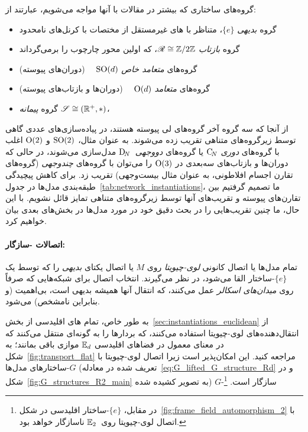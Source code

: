گروه‌های ساختاری که بیشتر در مقالات با آنها مواجه می‌شویم، عبارتند از:
\begin{itemize}
	\item[{\rule[2.0pt]{2pt}{2pt}}]
	گروه \emph{بدیهی} $\{e\}$، متناظر با \CNN های غیرمستقل از مختصات با کرنل‌های نامحدود
	\item[{\rule[2.0pt]{2pt}{2pt}}]
	گروه \emph{بازتاب} $\mathscr{R} \cong \mathbb{Z}/2\mathbb{Z}$، که اولین محور چارچوب را برمی‌گرداند
	\item[{\rule[2.0pt]{2pt}{2pt}}]
	گروه‌های \emph{متعامد خاص} $\operatorname{SO}(d)$
	\ \ (دوران‌های پیوسته)
	\item[{\rule[2.0pt]{2pt}{2pt}}]
	گروه‌های \emph{متعامد} $\operatorname{O}(d)$
	\ \ (دوران‌ها و بازتاب‌های پیوسته)
	\item[{\rule[2.0pt]{2pt}{2pt}}]
	گروه \emph{پیمانه} $\mathscr{S} \cong (\mathbb{R}^+,*)$،
\end{itemize}
از آنجا که سه گروه آخر گروه‌های لی پیوسته هستند، در پیاده‌سازی‌های عددی گاهی توسط زیرگروه‌های متناهی تقریب زده می‌شوند.
به عنوان مثال، $\operatorname{SO}(2)$ و $\operatorname{O}(2)$ اغلب با گروه‌های \emph{دوری} $\operatorname{C}_{\!N}$ یا گروه‌های \emph{دووجهی}~$\operatorname{D}_{\!N}$ مدل‌سازی می‌شوند، در حالی که دوران‌ها و بازتاب‌های سه‌بعدی در $\operatorname{O}(3)$ را می‌توان با گروه‌های \emph{چندوجهی} (گروه‌های تقارن اجسام افلاطونی، به عنوان مثال بیست‌وجهی) تقریب زد.
برای کاهش پیچیدگی طبقه‌بندی مدل‌ها در جدول~\ref{tab:network_instantiations}، ما تصمیم گرفتیم بین تقارن‌های پیوسته و تقریب‌های آنها توسط زیرگروه‌های متناهی تمایز قائل نشویم.
با این حال، ما چنین تقریب‌هایی را در بحث دقیق خود در مورد مدل‌ها در بخش‌های بعدی بیان خواهیم کرد.

\paragraph{اتصالات \textit{}-سازگار:}
تمام مدل‌ها یا اتصال کانونی \emph{لوی-چیویتا} روی $M$ یا اتصال یکتای \emph{بدیهی} را که توسط یک $\{e\}$-ساختار القا می‌شود، در نظر می‌گیرند.
انتخاب اتصال برای شبکه‌هایی که صرفاً روی \emph{میدان‌های اسکالر} عمل می‌کنند، که انتقال آنها همیشه بدیهی است، بی‌اهمیت (و بنابراین نامشخص) می‌شود.

به طور خاص، تمام \CNN های اقلیدسی از بخش~\ref{sec:instantiations_euclidean} از انتقال‌دهنده‌های لوی-چیویتا استفاده می‌کنند، که بردارها را به گونه‌ای منتقل می‌کنند که در معنای معمول در فضاهای اقلیدسی $\mathbb{E}_d$ موازی باقی بمانند؛ به شکل~\ref{fig:transport_flat} مراجعه کنید.
این امکان‌پذیر است زیرا اتصال لوی-چیویتا با $G$-ساختارهای مدل‌ها (تعریف شده در معادله~\eqref{eq:G_lifted_G_structure_Rd} و در شکل~\ref{fig:G_structures_R2_main} به تصویر کشیده شده) $G$-سازگار است.%
\footnote{
	در مقابل، $\{e\}$-ساختار اقلیدسی در شکل~\ref{fig:frame_field_automorphism_2} با اتصال لوی-چیویتا روی~$\mathbb{E}_2$ ناسازگار خواهد بود.
}

